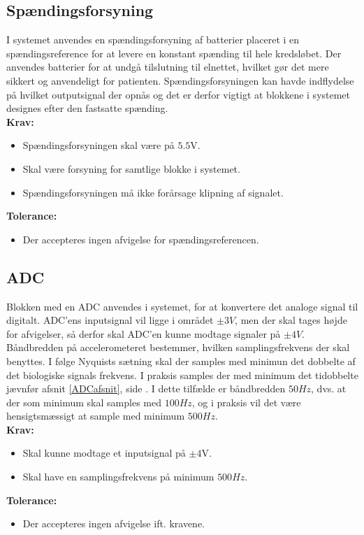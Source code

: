 \subsection{Spændingsforsyning}
I systemet anvendes en spændingsforsyning af batterier placeret i en spændingsreference for at levere en konstant spænding til hele kredsløbet. Der anvendes batterier for at undgå tilslutning til elnettet, hvilket gør det mere sikkert og anvendeligt for patienten. Spændingsforsyningen kan havde indflydelse på hvilket outputsignal der opnås og det er derfor vigtigt at blokkene i systemet designes efter den fastsatte spænding. \\
\noindent\textbf{Krav:}
\begin{itemize}
\item Spændingsforsyningen skal være på $5.5$V.
\item Skal være forsyning for samtlige blokke i systemet.
\item Spændingsforsyningen må ikke forårsage klipning af signalet.
\end{itemize}
\noindent\textbf{Tolerance:}
\begin{itemize}
\item Der accepteres ingen afvigelse for spændingsreferencen.
\end{itemize}

\subsection{ADC}
Blokken med en ADC anvendes i systemet, for at konvertere det analoge signal til digitalt. %
ADC'ens inputsignal vil ligge i området $\pm3V$, men der skal tages højde for afvigelser, så derfor skal ADC'en kunne modtage signaler på $\pm4V$. Båndbredden på accelerometeret bestemmer, hvilken samplingsfrekvens der skal benyttes. I følge Nyquists sætning skal der samples med minimun det dobbelte af det biologiske signals frekvens. I praksis samples der med minimum det tidobbelte jævnfør afsnit \ref{ADCafsnit}, side \pageref{ADCafsnit}. I dette tilfælde er båndbredden $50Hz$, dvs. at der som minimum skal samples med $100Hz$, og i praksis vil det være hensigtsmæssigt at sample med minimum $500Hz$. \\
\textbf{Krav:}
\begin{itemize}
	\item Skal kunne modtage et inputsignal på $\pm4$V.
	\item Skal have en samplingsfrekvens på minimum $500Hz$.
\end{itemize}
\textbf{Tolerance:}
\begin{itemize}
	\item Der accepteres ingen afvigelse ift. kravene.
\end{itemize}
